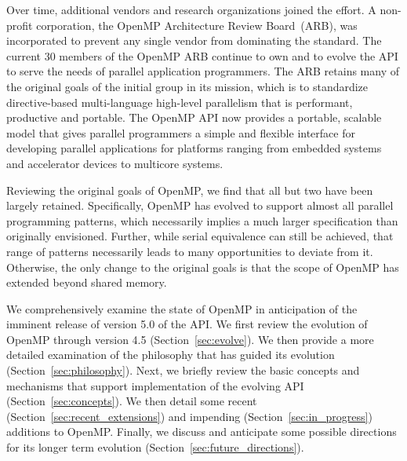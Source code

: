 Over time, additional vendors and research organizations joined the effort.  A
non-profit corporation, the OpenMP Architecture Review Board~(ARB), was 
incorporated to prevent any single vendor from dominating the standard.
The current 30 members of the OpenMP ARB continue to own and to evolve 
the API to serve the needs of parallel application programmers. The ARB
retains many of the original goals of the initial group in its mission,
which is to standardize directive-based multi-language high-level 
parallelism that is performant, productive and portable. The OpenMP 
API now provides a portable, scalable model that gives parallel 
programmers a simple and flexible interface for developing parallel 
applications for platforms ranging from embedded systems and accelerator 
devices to multicore systems.

Reviewing the original goals of OpenMP, we find that all but two have 
been largely retained. Specifically, OpenMP has evolved to support almost 
all parallel programming patterns, which necessarily implies a much larger 
specification than originally envisioned. Further, while serial equivalence
can still be achieved, that range of patterns necessarily leads to many
opportunities to deviate from it. Otherwise, the only change to the original
goals is that the scope of OpenMP has extended beyond shared memory. 

We comprehensively examine the state of OpenMP in anticipation of the imminent 
release of version 5.0 of the API. We first review the evolution of OpenMP 
through version 4.5 (Section~\ref{sec:evolve}). We then provide a more 
detailed examination of the philosophy that has guided its evolution 
(Section~\ref{sec:philosophy}). Next, we briefly review the basic concepts 
and mechanisms that support implementation of the evolving API 
(Section~\ref{sec:concepts}). We then detail some recent 
(Section~\ref{sec:recent_extensions}) and impending 
(Section~\ref{sec:in_progress}) additions to OpenMP. Finally, we discuss
and anticipate some possible directions for its longer term evolution
(Section~\ref{sec:future_directions}).
